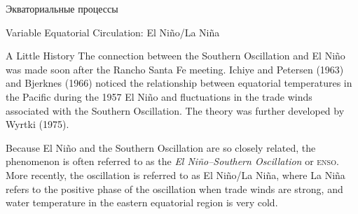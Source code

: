 \begin{chapter}{Экваториальные процессы}
\begin{section}{Variable Equatorial Circulation: El Ni\~{n}o/La Ni\~{n}a}
\begin{paragraph}{A Little History}
The connection between the Southern Oscillation and El Ni\~{n}o was made soon after the Rancho Santa Fe
meeting. Ichiye and Petersen (1963) and Bjerknes (1966) noticed the
relationship between equatorial temperatures in the Pacific during the
1957 El Ni\~{n}o and fluctuations in the trade winds associated with
the Southern Oscillation. The theory was further developed by Wyrtki
(1975).
%

Because El Ni\~{n}o and the Southern Oscillation are so closely related, the phenomenon is often referred
to as the \textit{El Ni\~{n}o--Southern Oscillation} or
\textsc{enso}. More recently, the oscillation is referred to as El
Ni\~{n}o/La Ni\~{n}a, where La Ni\~{n}a refers to the positive phase
of the oscillation when trade winds are strong, and water temperature
in the eastern equatorial region is very cold.
%
\end{paragraph}


\end{section}
\end{chapter}
